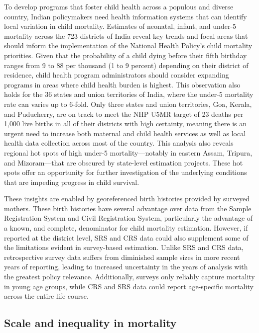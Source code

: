 \documentclass[
]{article}
\begin{document}
To develop programs that foster child health across a populous and diverse country, Indian policymakers need health information systems that can identify local variation in child mortality. Estimates of neonatal, infant, and under-5 mortality across the 723 districts of India reveal key trends and focal areas that should inform the implementation of the National Health Policy's child mortality priorities. Given that the probability of a child dying before their fifth birthday ranges from 9 to 88 per thousand (1 to 9 percent) depending on their district of residence, child health program administrators should consider expanding programs in areas where child health burden is highest. This observation also holds for the 36 states and union territories of India, where the under-5 mortality rate can varies up to 6-fold. Only three states and union territories, Goa, Kerala, and Puducherry, are on track to meet the NHP U5MR target of 23 deaths per 1,000 live births in all of their districts with high certainty, meaning there is an urgent need to increase both maternal and child health services as well as local health data collection across most of the country. This analysis also reveals regional hot spots of high under-5 mortality---notably in eastern Assam, Tripura, and Mizoram---that are obscured by state-level estimation projects. These hot spots offer an opportunity for further investigation of the underlying conditions that are impeding progress in child survival.

These insights are enabled by georeferenced birth histories provided by surveyed mothers. These birth histories have several advantage over data from the Sample Registration System and Civil Registration System, particularly the advantage of a known, and complete, denominator for child mortality estimation. However, if reported at the district level, SRS and CRS data could also supplement some of the limitations evident in survey-based estimation. Unlike SRS and CRS data, retrospective survey data suffers from diminished sample sizes in more recent years of reporting, leading to increased uncertainty in the years of analysis with the greatest policy relevance. Additionally, surveys only reliably capture mortality in young age groups, while CRS and SRS data could report age-specific mortality across the entire life course.

\hypertarget{scale-and-inequality-in-mortality}{%
\subsection{Scale and inequality in mortality}\label{scale-and-inequality-in-mortality}}
\end{document}
